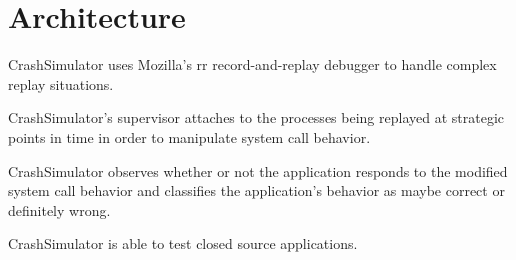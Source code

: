 %        
%
%

\section{Architecture}
\label{SEC:architecture}

CrashSimulator uses Mozilla's rr record-and-replay debugger to handle
complex replay situations.

CrashSimulator's supervisor attaches to the processes being replayed at
strategic points in time in order to manipulate system call behavior.

CrashSimulator observes whether or not the application responds to the
modified system call behavior and classifies the application's behavior as
maybe correct or definitely wrong.

CrashSimulator is able to test closed source applications.
